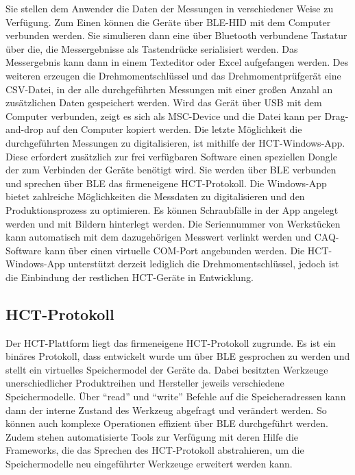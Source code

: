 Sie stellen dem Anwender die Daten der Messungen in verschiedener Weise zu Verfügung. Zum Einen können die Geräte über BLE-HID mit dem Computer verbunden werden. Sie simulieren dann eine über Bluetooth verbundene Tastatur über die, die Messergebnisse als Tastendrücke serialisiert werden. Das Messergebnis kann dann in einem Texteditor oder Excel aufgefangen werden. Des weiteren erzeugen die Drehmomentschlüssel und das Drehmomentprüfgerät eine CSV-Datei, in der alle durchgeführten Messungen mit einer großen Anzahl an zusätzlichen Daten gespeichert werden. Wird das Gerät über USB mit dem Computer verbunden, zeigt es sich als MSC-Device und die Datei kann per Drag-and-drop auf den Computer kopiert werden. Die letzte Möglichkeit die durchgeführten Messungen zu digitalisieren, ist mithilfe der HCT-Windows-App. Diese erfordert zusätzlich zur frei verfügbaren Software einen speziellen Dongle der zum Verbinden der Geräte benötigt wird. Sie werden über BLE verbunden und sprechen über BLE das firmeneigene HCT-Protokoll. Die Windows-App bietet zahlreiche Möglichkeiten die Messdaten zu digitalisieren und den Produktionsprozess zu optimieren. Es können Schraubfälle in der App angelegt werden und mit Bildern hinterlegt werden. Die Seriennummer von Werkstücken kann automatisch mit dem dazugehörigen Messwert verlinkt werden und CAQ-Software kann über einen virtuelle COM-Port angebunden werden. Die HCT-Windows-App unterstützt derzeit lediglich die Drehmomentschlüssel, jedoch ist die Einbindung der restlichen HCT-Geräte in Entwicklung.

\subsection{HCT-Protokoll}
Der HCT-Plattform liegt das firmeneigene HCT-Protokoll zugrunde. Es ist ein binäres Protokoll, dass entwickelt wurde um über BLE gesprochen zu werden und stellt ein virtuelles Speichermodel der Geräte da. Dabei besitzten Werkzeuge unerschiedlicher Produktreihen und Hersteller jeweils verschiedene Speichermodelle. Über ``read'' und ``write'' Befehle auf die Speicheradressen kann dann der interne Zustand des Werkzeug abgefragt und verändert werden. So können auch komplexe Operationen effizient über BLE durchgeführt werden. Zudem stehen automatisierte Tools zur Verfügung mit deren Hilfe die Frameworks, die das Sprechen des HCT-Protokoll abstrahieren, um die Speichermodelle neu eingeführter Werkzeuge erweitert werden kann.

